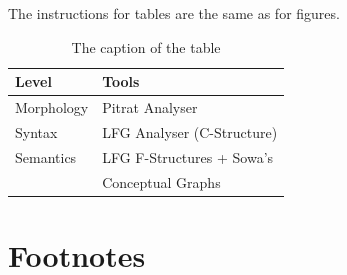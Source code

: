 \documentclass{lrec}
\begin{document}
The instructions for tables are the same as for figures.
%
\begin{table}[!h]
\begin{center}
\begin{tabularx}{\columnwidth}{|l|X|}

      \hline
      Level&Tools\\
      \hline
      Morphology & Pitrat Analyser\\
      \hline
      Syntax & LFG Analyser (C-Structure)\\
      \hline
     Semantics & LFG F-Structures + Sowa's\\
     & Conceptual Graphs\\
      \hline

\end{tabularx}
\caption{The caption of the table}
 \end{center}
\end{table}

%
%
%
%
%

\section{Footnotes}
\end{document}

